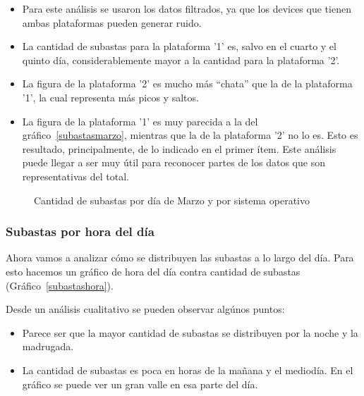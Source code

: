 \documentclass[a4paper, 12pt]{article}
\begin{document}
	\begin{itemize}
		\item Para este análisis se usaron los datos filtrados, ya que los devices que tienen ambas plataformas pueden generar ruido.
		\item La cantidad de subastas para la plataforma '1' es, salvo en el cuarto y el quinto día, considerablemente mayor a la cantidad para la plataforma '2'.
		\item La figura de la plataforma '2' es mucho más ``chata'' que la de la plataforma '1', la cual representa más picos y saltos.
		\item La figura de la plataforma '1' es muy parecida a la del gráfico~\ref{subastasmarzo}, mientras que la de la plataforma '2' no lo es. Esto es resultado, principalmente, de lo indicado en el primer ítem. Este análisis puede llegar a ser muy útil para reconocer partes de los datos que son representativas del total.
	\end{itemize}


	\begin{figure}[H]
			\centering
		   	\caption{Cantidad de subastas por día de Marzo y por sistema operativo}
		   	\label{subastasmarzoSO}
	\end{figure}

	\subsubsection{Subastas por hora del día}
	 Ahora vamos a analizar cómo se distribuyen las subastas a lo largo del día. Para esto hacemos un gráfico de hora del día contra cantidad de subastas (Gráfico~\ref{subastashora}).
	 
	 Desde un análisis cualitativo se pueden observar algúnos puntos:
	 
	 
	\begin{itemize}
		\item Parece ser que la mayor cantidad de subastas se distribuyen por la noche y la madrugada.
		\item La cantidad de subastas es poca en horas de la mañana y el mediodía. En el gráfico se puede ver un gran valle en esa parte del día.
	\end{itemize}
\end{document}
